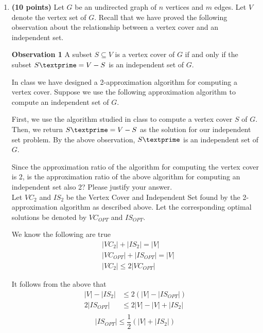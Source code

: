 \documentclass[paper=a4, fontsize=11pt]{scrartcl} %
\numberwithin{figure}{section} %
\numberwithin{table}{section} %
\begin{document}
\begin{enumerate}
\item \textbf{(10 points)} Let $G$ be an undirected graph of $n$ vertices and $m$ edges. Let $V$ denote the vertex set of $G$. Recall that we have proved the following observation about the relationship between a vertex cover and an independent set.

\textbf{Observation 1} A subset $S \subseteq V$ is a vertex cover of $G$ if and only if the subset $S\textprime = V - S$ is an independent set of $G$.

In class we have designed a 2-approximation algorithm for computing a vertex cover. Suppose we use the following approximation algorithm to compute an independent set of $G$.

First, we use the algorithm studied in class to compute a vertex cover $S$ of $G$. Then, we return $S\textprime = V - S$ as the solution for our independent set problem. By the above observation, $S\textprime$ is an independent set of $G$.

Since the approximation ratio of the algorithm for computing the vertex cover is 2, is the approximation ratio of the above algorithm for computing an independent set also 2? 
Please justify your answer.\\

Let $VC_2$ and $IS_2$ be the Vertex Cover and Independent Set found by the 2-approximation algorithm as described above. Let the corresponding optimal solutions be denoted by $VC_{OPT}$ and $IS_{OPT}$.

We know the following are true
\begin{align*} \label{ISplusVC}
&\left | VC_2 \right | + \left | IS_2 \right | = \left | V \right |\\
&\left | VC_{OPT} \right | + \left | IS_{OPT} \right | = \left | V \right |\\
&\left | VC_2 \right | \leq 2 \left | VC_{OPT} \right |
\end{align*}

It follows from the above that
\begin{align*} 
\left | V \right | - \left | IS_2 \right | &\leq 2( \left | V \right | - \left| IS_{OPT} \right|)\\
2 \left | IS_{OPT} \right | &\leq 2 \left | V \right | - \left | V \right | + \left | IS_2 \right |\\
\end{align*}
\begin{equation} 
\label{eq1}
\left | IS_{OPT} \right | \leq \frac{1}{2} (\left | V \right | + \left | IS_2 \right |)
\end{equation}


\end{enumerate}
\end{document}
